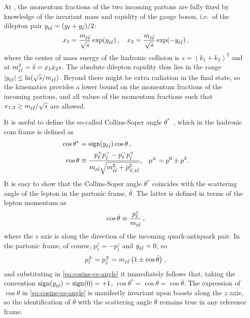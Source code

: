 At \lo, the momentum fractions of the two incoming partons are fully
fixed by knowledge of the invariant mass and rapidity of the gauge
boson, i.e.\ of the dilepton pair  $y_{\ell\bar{\ell}} = (y_\ell + y_{\bar{\ell}})/2$: 
\begin{equation}
  \label{eq:x_fractions}
  x_1 = \frac{ m_{\ell\bar{\ell}}}{\sqrt{s}}\exp(y_{\ell\bar{\ell}}) \, ,\quad x_2 = \frac{
  m_{\ell\bar{\ell}}}{\sqrt{s}}\exp(-y_{\ell\bar{\ell}}) \, ,
\end{equation}
where the center of mass energy of the hadronic collision is
$s=(k_1+k_2)^2$ and at \lo
$m_{\ell\bar{\ell}}^2 = \hat s = x_1 x_2 s$. The absolute dilepton
rapidity thus lies in the range $|y_{\ell\bar{\ell}}|\le \ln (\sqrt{s}/m_{\ell\bar{\ell}})$.
Beyond \lo there might be extra radiation in the final state, so the \lo
kinematics provides a lower bound on the momentum fractions of the
incoming partons, and all values of the momentum
fractions such that $x_{1,2}\ge m_{\ell\bar{\ell}}/\sqrt s$ are allowed.

It is useful to define the so-called  Collins-Soper
angle $\theta^*$~\cite{Collins:1977iv}, which in the hadronic \acrfull{com}
frame is defined as
\begin{equation}
\begin{split}
  \cos\theta^* &= \operatorname{sign} (y_{\ell\bar{\ell}}) \cos\theta \, ,\\
  \cos\theta &\equiv\frac{p_\ell^+ p_{\bar{\ell}}^- - p_\ell^- p_{\bar{\ell}}^+}{m_{\ell\bar{\ell}} \sqrt{m_{\ell\bar{\ell}}^2 + p_{\mathrm{T},\ell\bar{\ell}}^2}} \text{,} \quad p^\pm = p^0 \pm p^3 \text{.}
  \label{eq:cosine-cs-angle}
\end{split}
\end{equation}
It is easy to show that the Collins-Soper angle $\theta^*$ coincides with the
scattering angle of the lepton in the partonic \com frame, $\bar\theta$.
%
The latter is defined in terms of the lepton momentum as 
\begin{equation}
 \cos\bar\theta \equiv \frac{p^z_\ell}{m_{\ell\bar{\ell}}} \,, \label{eq:coscm}
\end{equation}
where the $z$ axis is along the direction of the incoming quark-antiquark pair.
%
In the partonic \com frame, of course, $p^z_\ell=-p^z_{\bar \ell}$ and $y_{\ell\bar{\ell}}
=0$, so
\begin{equation}
p^\pm_\ell=p^{\mp}_{\bar{\ell}}=  m_{\ell\bar{\ell}} \left( 1\pm \cos{\bar\theta} \right)\, ,
\end{equation}
and substituting in \cref{eq:cosine-cs-angle} it immediately follows that,
taking the convention 
$\operatorname{sign} (y_{\ell\bar{\ell}})=\operatorname{sign}(0)=+1$, 
$\cos\theta^*=\cos\theta=\cos{\bar\theta}$.
%
The expression of $\cos\theta$ in \cref{eq:cosine-cs-angle} is manifestly
invariant upon boosts along the $z$ axis, so the identification of $\theta$
with the \com scattering angle $\bar\theta$ remains true in any reference
frame.

